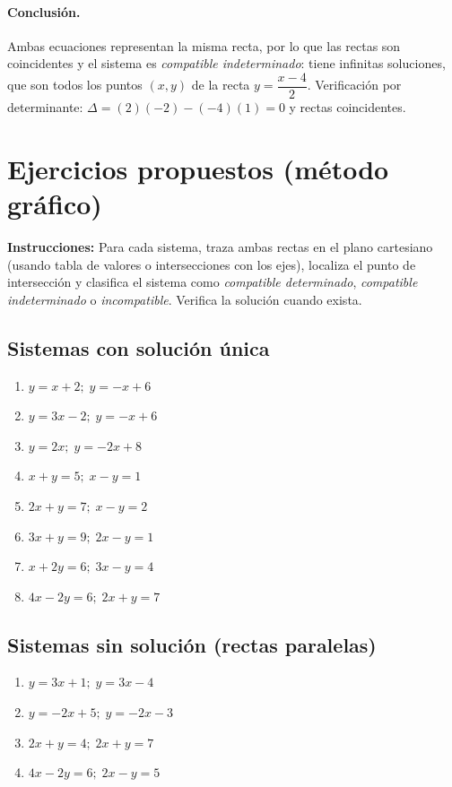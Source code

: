 \documentclass[12pt]{article}
\begin{document}
\paragraph{Conclusión.} Ambas ecuaciones representan la misma recta, por lo que las rectas son coincidentes y el sistema es \emph{compatible indeterminado}: tiene infinitas soluciones, que son todos los puntos \((x,y)\) de la recta \(y=\dfrac{x-4}{2}\). Verificación por determinante: \(\Delta=(2)(-2)-(-4)(1)=0\) y rectas coincidentes.

\section{Ejercicios propuestos (método gráfico)}

\textbf{Instrucciones:} Para cada sistema, traza ambas rectas en el plano cartesiano (usando tabla de valores o intersecciones con los ejes), localiza el punto de intersección y clasifica el sistema como \emph{compatible determinado}, \emph{compatible indeterminado} o \emph{incompatible}. Verifica la solución cuando exista.

\subsection{Sistemas con solución única}

\begin{enumerate}[leftmargin=*, itemsep=0.6em, start=1]
  \item \(y = x+2;\; y = -x+6\)
  \item \(y = 3x-2;\; y = -x+6\)
  \item \(y = 2x;\; y = -2x+8\)
  \item \(x+y = 5;\; x-y = 1\)
  \item \(2x+y = 7;\; x-y = 2\)
  \item \(3x+y = 9;\; 2x-y = 1\)
  \item \(x+2y = 6;\; 3x-y = 4\)
  \item \(4x-2y = 6;\; 2x+y = 7\)
\end{enumerate}

\subsection{Sistemas sin solución (rectas paralelas)}

\begin{enumerate}[leftmargin=*, itemsep=0.6em, start=9]
  \item \(y = 3x+1;\; y = 3x-4\)
  \item \(y = -2x+5;\; y = -2x-3\)
  \item \(2x+y = 4;\; 2x+y = 7\)
  \item \(4x-2y = 6;\; 2x-y = 5\)
\end{enumerate}
\end{document}
